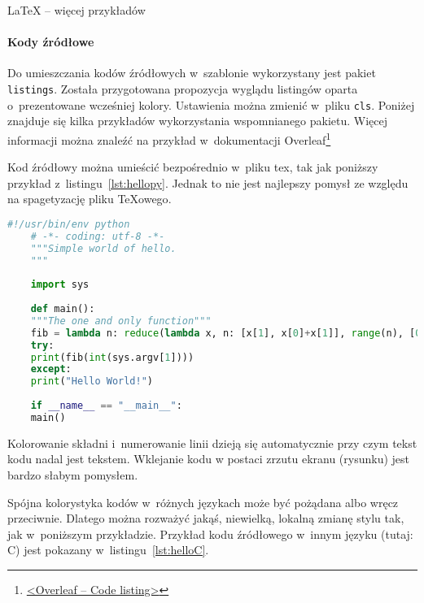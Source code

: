 \begin{easyappendix}{\LaTeX{} -- więcej przykładów}

\paragraph{Kody źródłowe}
Do umieszczania kodów źródłowych w~szablonie wykorzystany jest pakiet \texttt{listings}. Została przygotowana propozycja wyglądu listingów oparta o~prezentowane wcześniej kolory. Ustawienia można zmienić w~pliku \texttt{cls}. Poniżej znajduje się kilka przykładów wykorzystania wspomnianego pakietu. Więcej informacji można znaleźć na przykład w~dokumentacji Overleaf\footnote{\href{https://www.overleaf.com/learn/latex/code_listing}{<Overleaf -- Code listing>}}

Kod źródłowy można umieścić bezpośrednio w~pliku tex, tak jak poniższy przykład z~listingu~\ref{lst:hellopy}. Jednak to nie jest najlepszy pomysł ze względu na spagetyzację pliku \TeX{owego}.

\begin{lstlisting}[language=Python,
	caption={Prosty skrypt w~języku Python},
	label={lst:hellopy}]
	#!/usr/bin/env python
	# -*- coding: utf-8 -*-
	"""Simple world of hello.
	"""
	
	import sys
	
	def main():
	"""The one and only function"""
	fib = lambda n: reduce(lambda x, n: [x[1], x[0]+x[1]], range(n), [0, 1])[0]
	try:
	print(fib(int(sys.argv[1])))
	except:
	print("Hello World!")
	
	if __name__ == "__main__":
	main()
\end{lstlisting}

Kolorowanie składni i~numerowanie linii dzieją się automatycznie przy czym tekst kodu nadal jest tekstem.  Wklejanie kodu w postaci zrzutu ekranu (rysunku) jest bardzo słabym pomysłem.

Spójna kolorystyka kodów w~różnych językach może być pożądana albo wręcz przeciwnie. Dlatego można rozważyć jakąś, niewielką, lokalną zmianę stylu tak, jak w~poniższym przykładzie. Przykład kodu źródłowego w~innym języku (tutaj: C) jest pokazany w~listingu~\ref{lst:helloC}. 


\end{easyappendix}
